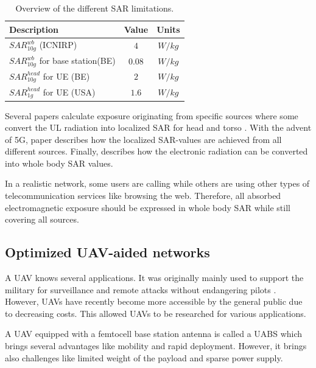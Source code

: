 \documentclass[twocolumn]{phdsymp} %
\begin{document}
\begin{table}[h!]
\centering
\begin{tabular}{|l|c|c|}
\hline
\textbf{Description} & \textbf{Value} & \textbf{Units} \\ \hline
$SAR^{wb}_{10g}$ (\gls{ICNIRP})                           &  $4$ & $W/kg$              \\ \hline
$SAR^{wb}_{10g}$ for base station(BE)                & $0.08$ & $W/kg$               \\ \hline
$SAR_{10g}^{head}$ for \acs{UE} (BE)                  & $2$ & $W/kg$               \\ \hline
$SAR_{1g}^{head}$ for \acs{UE} (\gls{USA})                  & $1.6$ & $W/kg$               \\ \hline
\end{tabular}
\caption{Overview of the different \acs{SAR} limitations.}
\label{table:overviewSARValues}
\end{table}

Several papers calculate exposure originating from specific sources  \cite{J6_originalExposureFormula,J1,J10_RDP,J10.1} 
where some convert the \gls{UL} radiation into localized \gls{SAR} for head and torso \cite{J10_RDP,J10.1}. 
With the advent of 5G, paper \cite{J17_kuehn2019modelling} describes 
how the localized \gls{SAR}-values are achieved from all different sources.
Finally, \cite{J22_plets2015joint} describes how the electronic radiation can be converted into whole body SAR values.

In a realistic network, some users are calling while others are using other types of telecommunication services like browsing the web.
Therefore, all absorbed electromagnetic exposure should be expressed in whole body SAR while still covering all sources.

\subsection{Optimized \gls{UAV}-aided networks}

A \gls{UAV} knows several applications. It was originally mainly used to support the military for surveillance and remote attacks without 
endangering pilots \cite{U12}. However, \gls{UAV}s have recently become more accessible by the general public due to decreasing costs. This 
allowed \gls{UAV}s to be researched for various applications.

A \gls{UAV} equipped with a femtocell base station antenna is called a \gls{UABS}
which brings several advantages like mobility and rapid deployment. 
However, it brings also challenges like limited weight of the payload and sparse power supply.
\end{document}
